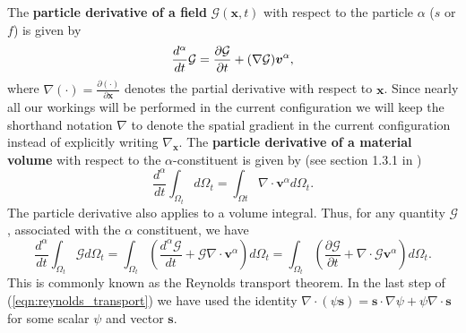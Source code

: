 The \textbf{particle derivative of a field} $\mathcal{G}(\boldsymbol{x},t)$ with respect to the particle $\alpha$ ($s$ or $f$) is given by %
\begin{equation}
\frac{d^{\alpha}}{dt} \mathcal{G}=\frac{\partial \mathcal{G}}{\partial t}  + (\nabla\mathcal{G})\boldsymbol{v}^{\alpha},
\label{eqn:material_deriv}
\end{equation}
where $\nabla( \cdot)= \frac{\partial (\cdot) }{\partial \boldsymbol{x} } $ denotes the partial derivative with respect to $\boldsymbol{x}$. Since nearly all our workings will be performed in the current configuration we will keep the shorthand notation $\nabla$ to denote the spatial gradient in the current configuration instead of explicitly writing  $\nabla_{\boldsymbol{x}}$. The \textbf{particle derivative of a material volume} with respect to the $\alpha$-constituent is given by (see section 1.3.1 in \cite{coussy2004poromechanics})
\begin{equation}
\frac{d^{\alpha}}{dt}\int_{\Omega_{t}} d \Omega_{t}=\int_{\Omega t} \nabla \cdot \boldsymbol{v}^{\alpha}  d \Omega_{t}. 
\end{equation}
The particle derivative also applies to a volume integral. Thus, for any quantity $\mathcal{G}$, associated with the $\alpha$ constituent, we have %
\begin{equation}
\label{eqn:reynolds_transport}
\frac{d^{\alpha}}{dt} \int_{\Omega_{t}} \mathcal{G} d \Omega_{t} = \int_{\Omega_{t}} \left( \frac{d^{\alpha}\mathcal{G}}{dt} + \mathcal{G} \nabla \cdot \boldsymbol{v}^{\alpha} \right) d \Omega_{t}= \int_{\Omega_{t}} \left( \frac{\partial \mathcal{G}}{ \partial t} +  \nabla \cdot \mathcal{G} \boldsymbol{v}^{\alpha} \right) d \Omega_{t}.
\end{equation}
This is commonly known as the Reynolds transport theorem. In the last step of (\ref{eqn:reynolds_transport}) we have used the identity  $\nabla \cdot (\psi \boldsymbol{s}) =  \boldsymbol{s} \cdot \nabla \psi + \psi \nabla \cdot \boldsymbol{s} $ for some scalar $\psi$ and vector $\boldsymbol{s}$.